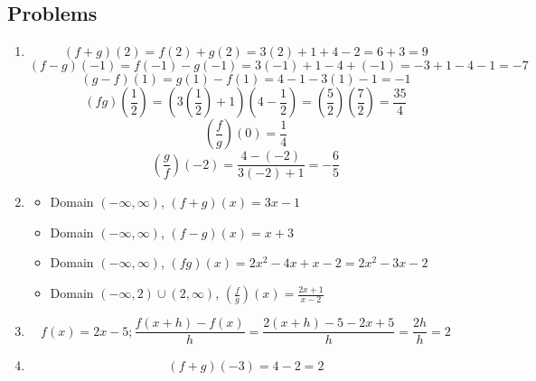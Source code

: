 \subsection{Problems}
\begin{enumerate}
      \item[1.]
            \[(f+g)(2) = f(2) + g(2) = 3(2) + 1 + 4 - 2 = 6 + 3 = 9\]
            \[(f-g)(-1) = f(-1) - g(-1) = 3(-1) + 1 - 4 + (-1) = -3 + 1 - 4 - 1 = -7\]
            \[(g-f)(1) = g(1) - f(1) = 4 - 1 - 3(1) - 1 = -1\]
            \[(fg)(\frac{1}{2}) = (3(\frac{1}{2})+1)(4-\frac{1}{2}) = (\frac{5}{2})(\frac{7}{2}) = \frac{35}{4}\]
            \[(\frac{f}{g})(0) = \frac{1}{4}\]
            \[(\frac{g}{f})(-2) = \frac{4-(-2)}{3(-2)+1} = -\frac{6}{5}\]
      \item[11.] \begin{itemize}
                  \item Domain $(-\infty, \infty)$, $(f+g)(x) = 3x -1$
                  \item Domain $(-\infty, \infty)$, $(f-g)(x) = x + 3$
                  \item Domain $(-\infty, \infty)$, $(fg)(x) = 2x^2 - 4x +x -2 = 2x^2 -3x -2$
                  \item Domain $(-\infty, 2) \cup (2, \infty)$, $(\frac{f}{g})(x) = \frac{2x + 1}{x - 2}$
            \end{itemize}
      \item[21.]
            \[f(x)=2x - 5; \frac{f(x + h) - f(x)}{h} = \frac{2(x+h) - 5 - 2x + 5}{h} = \frac{2h}{h} = 2\]
      \item[51.]
            \[(f+g)(-3) = 4 - 2 = 2\]
\end{enumerate}